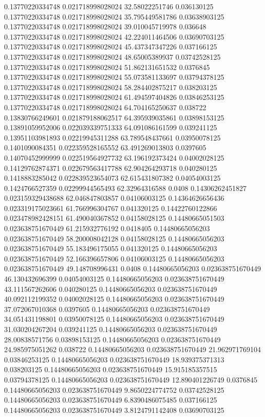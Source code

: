 0.13770220334748 0.021718998028024 32.58022251746 0.036130125
0.13770220334748 0.021718998028024 35.795449581786 0.03638903125
0.13770220334748 0.021718998028024 39.010045719978 0.036648
0.13770220334748 0.021718998028024 42.224011464506 0.03690703125
0.13770220334748 0.021718998028024 45.437347347226 0.037166125
0.13770220334748 0.021718998028024 48.65005389937 0.03742528125
0.13770220334748 0.021718998028024 51.862131651532 0.0376845
0.13770220334748 0.021718998028024 55.073581133697 0.03794378125
0.13770220334748 0.021718998028024 58.284402875217 0.038203125
0.13770220334748 0.021718998028024 61.494597404826 0.03846253125
0.13770220334748 0.021718998028024 64.704165250637 0.038722
0.13830766249601 0.021879188062517 64.395939035861 0.03898153125
0.13891059952006 0.022039339751333 64.091086161599 0.039241125
0.13951103981893 0.02219945311288 63.789548437661 0.03950078125
0.1401090084351 0.022359528165552 63.491269013803 0.0397605
0.14070452999999 0.022519564927732 63.196192373424 0.04002028125
0.14129762874371 0.022679563417788 62.904264293718 0.040280125
0.1418883285042 0.022839523654073 62.615431807382 0.04054003125
0.1424766527359 0.02299944565493 62.32964316588 0.0408
0.14306262451827 0.023159329438688 62.046847803857 0.04106003125
0.14364626656436 0.023319175023661 61.766996304767 0.041320125
0.14422760122866 0.023478982428151 61.490040367852 0.04158028125
0.14480665051503 0.023638751670449 61.215932776192 0.0418405
0.14480665056203 0.023638751670449 58.200008042128 0.04158028125
0.14480665056203 0.023638751670449 55.183496175055 0.041320125
0.14480665056203 0.023638751670449 52.166396657806 0.04106003125
0.14480665056203 0.023638751670449 49.148708996431 0.0408
0.14480665056203 0.023638751670449 46.130432696399 0.04054003125
0.14480665056203 0.023638751670449 43.111567262606 0.040280125
0.14480665056203 0.023638751670449 40.092112199352 0.04002028125
0.14480665056203 0.023638751670449 37.072067010368 0.0397605
0.14480665056203 0.023638751670449 34.051431198801 0.03950078125
0.14480665056203 0.023638751670449 31.030204267204 0.039241125
0.14480665056203 0.023638751670449 28.00838571756 0.03898153125
0.14480665056203 0.023638751670449 24.985975051262 0.038722
0.14480665056203 0.023638751670449 21.962971769104 0.03846253125
0.14480665056203 0.023638751670449 18.939375371313 0.038203125
0.14480665056203 0.023638751670449 15.915185357515 0.03794378125
0.14480665056203 0.023638751670449 12.890401226749 0.0376845
0.14480665056203 0.023638751670449 9.8650224774752 0.03742528125
0.14480665056203 0.023638751670449 6.8390486075485 0.037166125
0.14480665056203 0.023638751670449 3.8124791142408 0.03690703125
